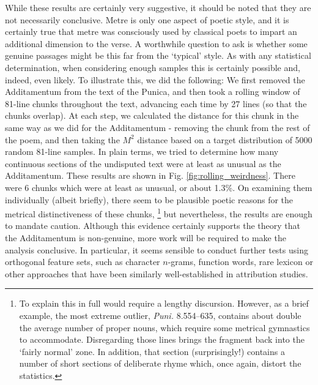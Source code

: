 \documentclass[11pt,a4paper]{scrartcl} %
\begin{document}
While these results are certainly very suggestive, it should be noted that they are not necessarily conclusive. Metre is only one aspect of poetic style, and it is certainly true that metre was consciously used by classical poets to impart an additional dimension to the verse. A worthwhile question to ask is whether some genuine passages might be this far from the `typical' style. As with any statistical determination, when considering enough samples this is certainly possible and, indeed, even likely. To illustrate this, we did the following: We first removed the Additamentum from the text of the Punica, and then took a rolling window of 81-line chunks throughout the text, advancing each time by 27 lines (so that the chunks overlap). At each step, we calculated the distance for this chunk in the same way as we did for the Additamentum - removing the chunk from the rest of the poem, and then taking the $M^{2}$ distance based on a target distribution of 5000 random 81-line samples. In plain terms, we tried to determine how many continuous sections of the undisputed text were at least as unusual as the Additamentum. These results are shown in Fig. \ref{fig:rolling_weirdness}. There were 6 chunks which were at least as unusual, or about 1.3\%. On examining them individually (albeit briefly), there seem to be plausible poetic reasons for the metrical distinctiveness of these chunks,%
\footnote{To explain this in full would require a lengthy discursion. However, as a brief example, the most extreme outlier, \textit{Puni.} 8.554--635, contains about double the average number of proper nouns, which require some metrical gymnastics to accommodate. Disregarding those lines brings the fragment back into the `fairly normal' zone. In addition, that section (surprisingly!) contains a number of short sections of deliberate rhyme which, once again, distort the statistics.}
but nevertheless, the results are enough to mandate caution. Although this evidence certainly supports the theory that the Additamentum is non-genuine, more work will be required to make the analysis conclusive. In particular, it seems sensible to conduct further tests using orthogonal feature sets, such as character $n$-grams, function words, rare lexicon or other approaches that have been similarly well-established in attribution studies.
\end{document}
